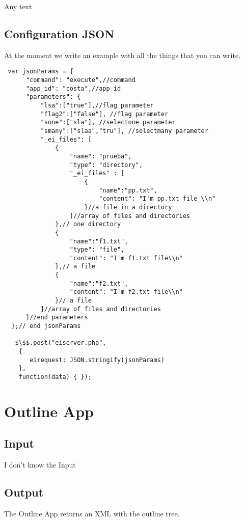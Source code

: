 \noindent
{}

Any text

\bigskip
\bigskip
\section{Configuration JSON}

At the moment we write an example with
 all the things that you can write.

\begin{lstlisting}
 var jsonParams = {
      "command": "execute",//command
      "app_id": "costa",//app id
      "parameters": {
          "lsa":["true"],//flag parameter
          "flag2":["false"], //flag parameter
          "sone":["sla"], //selectone parameter
          "smany":["slaa","tru"], //selectmany parameter
          "_ei_files": [
              {
                  "name": "prueba",
                  "type": "directory",
                  "_ei_files" : [
                      {
                          "name":"pp.txt",
                          "content": "I'm pp.txt file \\n"
                      }//a file in a directory
                  ]//array of files and directories
              },// one directory
              {
                  "name":"f1.txt",
                  "type": "file",
                  "content": "I'm f1.txt file\\n"
              },// a file
              {
                  "name":"f2.txt",
                  "content": "I'm f2.txt file\\n"
              }// a file
          ]//array of files and directories
      }//end parameters
  };// end jsonParams

   $\$$.post("eiserver.php",
    {
       eirequest: JSON.stringify(jsonParams)
    },
    function(data) { });
\end{lstlisting}

\chapter{Outline App}

\section{Input}
I don't know the Input

\section{Output}
The Outline App returns an XML with the outline tree.

